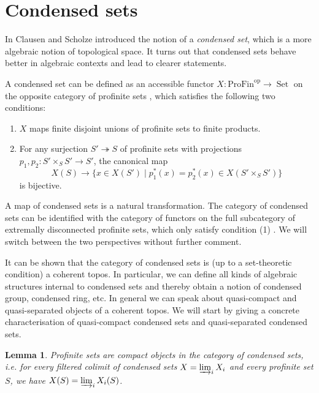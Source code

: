 \documentclass{amsart}
\newtheorem{lem}[prop]{Lemma}
\theoremstyle{definition}
\theoremstyle{remark}
\DeclareMathOperator{\Set}{Set}
\begin{document}


\appendix

\section{Condensed sets}\label{app_cond_set}

In \cite{ScholzeCond} Clausen and Scholze introduced the notion of a \emph{condensed set}, which is a more algebraic notion of topological space.
It turns out that condensed sets behave better in algebraic contexts and lead to clearer statements.

A condensed set can be defined as an accessible functor $X : \mathrm{ProFin}^{\mathrm{op}} \to \Set$ on the opposite category of profinite sets \cite[Footnote 5]{ScholzeCond}, which satisfies the following two conditions:
\begin{enumerate}
    \item $X$ maps finite disjoint unions of profinite sets to finite products.
    \item For any surjection $S' \twoheadrightarrow S$ of profinite sets with projections $p_1, p_2 : S' \times_S S' \to S'$, the canonical map
    $$ X(S) \to \{x \in X(S') \mid p_1^*(x) = p_2^*(x) \in X(S' \times_S S')\} $$
    is bijective.
\end{enumerate}
A map of condensed sets is a natural transformation.
The category of condensed sets can be identified with the category of functors on the full subcategory of extremally disconnected profinite sets, which only satisfy condition (1) \cite[Proposition 2.7]{ScholzeCond}. We will switch between the two perspectives without further comment.

It can be shown that the category of condensed sets is (up to a set-theoretic condition) a coherent topos.
In particular, we can define all kinds of algebraic structures internal to condensed sets and thereby obtain a notion of condensed group, condensed ring, etc.
In general we can speak about quasi-compact and quasi-separated objects of a coherent topos.
We will start by giving a concrete characterisation of quasi-compact condensed sets and quasi-separated condensed sets.

\begin{lem}\label{profiniteiscompact}
    Profinite sets are compact objects in the category of condensed sets, i.e. for every filtered colimit of condensed sets $X = \varinjlim_i X_i$ and every profinite set $S$, we have $X(S) = \varinjlim_i X_i(S)$.
\end{lem}
\end{document}
